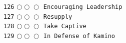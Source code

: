 \documentclass[a4paper,landscape]{article}
\begin{document}
\begin{multicols*}{5}
\texttt{126} \(\bigcirc\!\bigcirc\!\bigcirc\)  \texttt{Encouraging Leadership} \vspace{-0.3mm}\\ 
\texttt{127} \(\bigcirc\!\bigcirc\!\bigcirc\)  \texttt{Resupply} \vspace{-0.3mm}\\ 
\texttt{128} \(\bigcirc\!\bigcirc\!\bigcirc\)  \texttt{Take Captive} \vspace{-0.3mm}\\ 
\texttt{129} \(\bigcirc\!\bigcirc\!\bigcirc\)  \texttt{In Defense of Kamino} \vspace{-0.3mm}\\ 

\end{multicols*}
\end{document}
